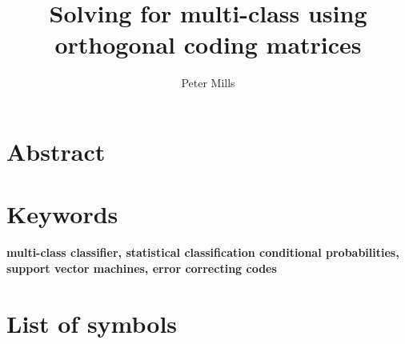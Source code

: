 \documentclass{article}
\title{Solving for multi-class using orthogonal coding matrices}
\author{Peter Mills}
\begin{document}
\maketitle

\section*{Abstract}



\section*{Keywords}
\textbf{multi-class classifier, 
	statistical classification conditional probabilities,
	support vector machines,
error correcting codes}

\tableofcontents

\section*{List of symbols}






\end{document}
